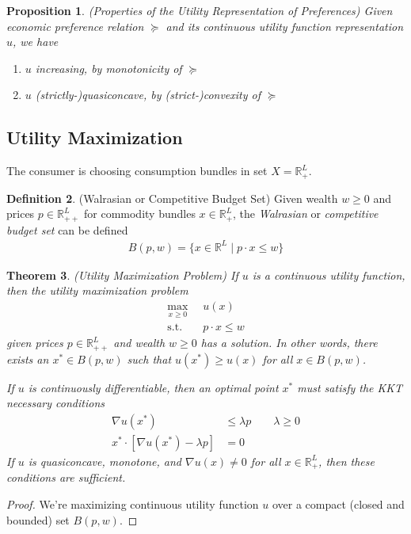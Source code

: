 \documentclass[12pt]{article}
\theoremstyle{plain}
\newtheorem{thm}{Theorem}[section]
\newtheorem{prop}[thm]{Proposition}
\theoremstyle{definition}
\newtheorem{defn}[thm]{Definition}
\theoremstyle{remark}
\newcommand{\R}{\mathbb{R}}
\begin{document}
\begin{prop}
\emph{(Properties of the Utility Representation of Preferences)}
Given economic preference relation $\succeq$ and its continuous utility
function representation $u$, we have
\begin{enumerate}
  \item $u$ increasing, by monotonicity of $\succeq$
  \item $u$ (strictly-)quasiconcave, by (strict-)convexity of $\succeq$
\end{enumerate}
\end{prop}

\subsection{Utility Maximization}

The consumer is choosing consumption bundles in set $X=\R^L_{+}$.

\begin{defn}(Walrasian or Competitive Budget Set)
Given wealth $w\geq 0$ and prices $p \in \R^L_{++}$ for commodity
bundles $x\in \R^L_{+}$, the \emph{Walrasian} or
\emph{competitive budget set} can be defined
\begin{align*}
  B(p,w) = \{x\in\R^L \;|\; p \cdot x \leq w\}
\end{align*}
\end{defn}

\begin{thm}\emph{(Utility Maximization Problem)}
\label{thm:ump}
If $u$ is a continuous utility function, then the utility maximization
problem
\begin{align*}
  \max_{x\geq 0} &\;\; u(x) \\
  \text{s.t.} &\;\; p\cdot x \leq w
\end{align*}
given prices $p\in \R^L_{++}$ and wealth $w\geq 0$
has a solution. In other words, there exists an $x^* \in B(p,w)$ such
that $u(x^*) \geq u(x)$ for all $x\in B(p,w)$.

If $u$ is continuously differentiable, then an optimal point $x^*$ must
satisfy the KKT necessary conditions
\begin{align*}
  \nabla u(x^*) &\leq \lambda p
  \qquad \lambda \geq 0 \\
  x^* \cdot [ \nabla u(x^*) - \lambda p] &=0
\end{align*}
If $u$ is quasiconcave, monotone, and $\nabla u(x) \neq 0$ for all $x\in
\R^L_+$, then these conditions are sufficient.
\end{thm}
\begin{proof}
We're maximizing continuous utility function $u$ over a compact (closed
and bounded) set $B(p,w)$.
\end{proof}
\end{document}
